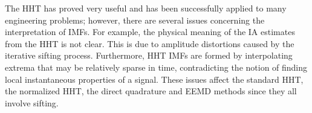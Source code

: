 \documentclass[a4paper]{IEEEtran}
\begin{document}

The HHT has proved very useful and has been successfully applied to many engineering problems; however, there are several issues concerning the interpretation of IMFs. For example, the physical meaning of the IA estimates from the HHT is not clear. This is due to amplitude distortions caused by the iterative sifting process. Furthermore, HHT IMFs are formed by interpolating extrema that may be relatively sparse in time, contradicting the notion of finding local instantaneous properties of a signal. These issues affect the standard HHT, the normalized HHT, the direct quadrature and EEMD methods since they all involve sifting. 

% 
\end{document}
